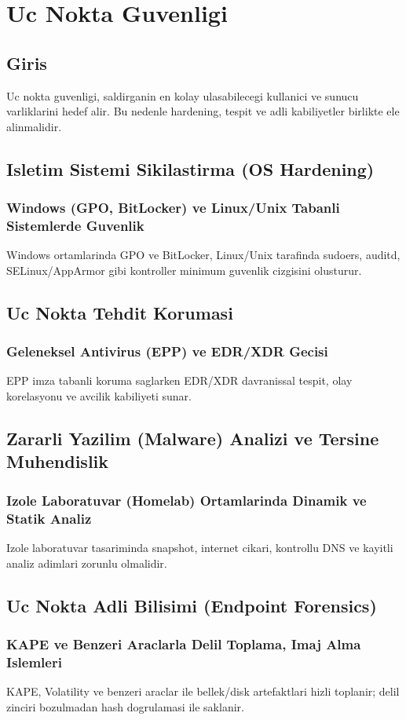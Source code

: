 ﻿\chapter{Uc Nokta Guvenligi}

\section*{Giris}
Uc nokta guvenligi, saldirganin en kolay ulasabilecegi kullanici ve sunucu varliklarini hedef alir. Bu nedenle hardening, tespit ve adli kabiliyetler birlikte ele alinmalidir.

\section{Isletim Sistemi Sikilastirma (OS Hardening)}
\subsection{Windows (GPO, BitLocker) ve Linux/Unix Tabanli Sistemlerde Guvenlik}
Windows ortamlarinda GPO ve BitLocker, Linux/Unix tarafinda sudoers, auditd, SELinux/AppArmor gibi kontroller minimum guvenlik cizgisini olusturur.

\section{Uc Nokta Tehdit Korumasi}
\subsection{Geleneksel Antivirus (EPP) ve EDR/XDR Gecisi}
EPP imza tabanli koruma saglarken EDR/XDR davranissal tespit, olay korelasyonu ve avcilik kabiliyeti sunar.

\section{Zararli Yazilim (Malware) Analizi ve Tersine Muhendislik}
\subsection{Izole Laboratuvar (Homelab) Ortamlarinda Dinamik ve Statik Analiz}
Izole laboratuvar tasariminda snapshot, internet cikari, kontrollu DNS ve kayitli analiz adimlari zorunlu olmalidir.

\section{Uc Nokta Adli Bilisimi (Endpoint Forensics)}
\subsection{KAPE ve Benzeri Araclarla Delil Toplama, Imaj Alma Islemleri}
KAPE, Volatility ve benzeri araclar ile bellek/disk artefaktlari hizli toplanir; delil zinciri bozulmadan hash dogrulamasi ile saklanir.

